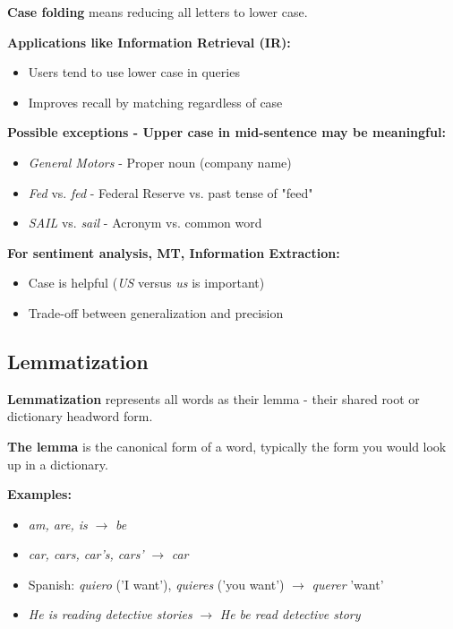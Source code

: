 \documentclass[11pt,a4paper]{article}
\theoremstyle{definition}
\theoremstyle{plain}
\theoremstyle{remark}
\begin{document}
\textbf{Case folding} means reducing all letters to lower case.

\textbf{Applications like Information Retrieval (IR):}
\begin{itemize}
    \item Users tend to use lower case in queries
    \item Improves recall by matching regardless of case
\end{itemize}

\textbf{Possible exceptions - Upper case in mid-sentence may be meaningful:}
\begin{itemize}
    \item \textit{General Motors} - Proper noun (company name)
    \item \textit{Fed} vs. \textit{fed} - Federal Reserve vs. past tense of "feed"
    \item \textit{SAIL} vs. \textit{sail} - Acronym vs. common word
\end{itemize}

\textbf{For sentiment analysis, MT, Information Extraction:}
\begin{itemize}
    \item Case is helpful (\textit{US} versus \textit{us} is important)
    \item Trade-off between generalization and precision
\end{itemize}

\subsection{Lemmatization}

\textbf{Lemmatization} represents all words as their lemma - their shared root or dictionary headword form.

\textbf{The lemma} is the canonical form of a word, typically the form you would look up in a dictionary.

\textbf{Examples:}
\begin{itemize}
    \item \textit{am, are, is} $\rightarrow$ \textit{be}
    \item \textit{car, cars, car's, cars'} $\rightarrow$ \textit{car}
    \item Spanish: \textit{quiero} ('I want'), \textit{quieres} ('you want') $\rightarrow$ \textit{querer} 'want'
    \item \textit{He is reading detective stories} $\rightarrow$ \textit{He be read detective story}
\end{itemize}
\end{document}
